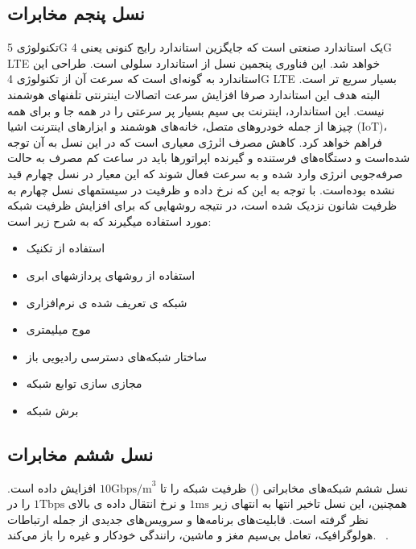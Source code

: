  \subsection{نسل پنجم مخابرات}
تکنولوژی 5G یک استاندارد صنعتی است که جایگزین استاندارد رایج کنونی یعنی 4G LTE خواهد شد. این فناوری پنجمین نسل از استاندارد سلولی است. طراحی این استاندارد به گونه‌ای است که سرعت آن از تکنولوژی 4G LTE بسیار سریع تر است. البته هدف این استاندارد صرفا افزایش سرعت اتصالات اینترنتی تلفنهای هوشمند نیست. این استاندارد، اینترنت بی سیم بسیار پر سرعتی را در همه جا و برای همه چیزها از جمله خودروهای متصل، خانه‌های هوشمند و ابزارهای اینترنت اشیا (IoT)، فراهم خواهد کرد. 
کاهش مصرف انٰرژی  معیاری است که در این نسل به آن توجه شده‌است و دستگاه‌های فرستنده و گیرنده اپراتورها باید در ساعت کم مصرف به حالت صرفه‌جویی انرژی وارد شده و به سرعت فعال شوند که این معیار در نسل چهارم قید نشده بوده‌است.
 با توجه
به این که نرخ داده و ظرفیت در سیستمهای نسل چهارم به ظرفیت
شانون نزدیک شده است، در نتیجه روشهایی که برای
افزایش ظرفیت شبکه مورد استفاده میگیرند که به شرح زیر است:
\begin{itemize}
\item
استفاده از تکنیک 
\item
استفاده از روشهای پردازشهای ابری
\item
شبکه ی تعریف شده ی نرم‌افزاری
\item
موج میلیمتری
\item 
ساختار شبکه‌های دسترسی رادیویی باز
\item 
مجازی سازی توابع شبکه
\item 
برش شبکه
\end{itemize}
\subsection{نسل ششم مخابرات}
نسل ششم شبکه‌های مخابراتی 
()
ظرفیت شبکه را تا 
$10\text{Gbps/m}^{3}$
افزایش داده است. همچنین، این نسل تاخیر انتها به انتهای زیر 
$1\text{ms}$
و نرخ انتقال داده ی بالای 
$1 \text{Tbps}$ 
را در نظر گرفته است.
قابلیت‌های  برنامه‌ها و سرویس‌های جدیدی از جمله ارتباطات هولوگرافیک، تعامل بی‌سیم مغز و ماشین، رانندگی خودکار و غیره را باز می‌کند.
~\cite{slawomir20216g}.

